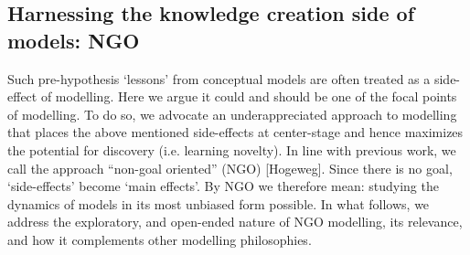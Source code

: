 \subsection{Harnessing the knowledge creation side of models: NGO}

Such pre-hypothesis `lessons’ from conceptual models are often treated as a side-effect of modelling.  Here we argue it could and should be one of the focal points of modelling. To do so, we advocate an underappreciated approach to modelling that places the above mentioned side-effects at center-stage and hence maximizes the potential for discovery (i.e. learning novelty). In line with previous work, we call the approach “non-goal oriented” (NGO) [Hogeweg]. Since there is no goal, ‘side-effects’ become ‘main effects’.  By NGO we therefore mean: studying the dynamics of models in its most unbiased form possible. In what follows, we address the exploratory, and open-ended nature of NGO modelling, its relevance, and how it complements other modelling philosophies.
